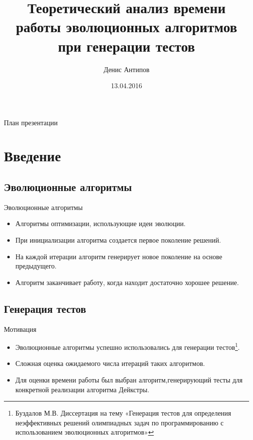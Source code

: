 \documentclass{beamer}
\begin{document}
\title[Автоматическая генерация тестов]{Теоретический анализ времени работы эволюционных алгоритмов при генерации тестов}
\author[Денис Антипов]{Денис Антипов}
\date{13.04.2016}

 
\begin{frame}
 \maketitle
\end{frame}
 
 \begin{frame}{План презентации}
  \tableofcontents
 \end{frame}

 \section{Введение}
 \subsection{Эволюционные алгоритмы}
 \begin{frame}{Эволюционные алгоритмы}
  \begin{itemize}
   \item Алгоритмы оптимизации, использующие идеи эволюции.
   \item При инициализации алгоритма создается первое поколение решений.
   \item На каждой итерации алгоритм генерирует новое поколение на основе предыдущего.
   \item Алгоритм заканчивает работу, когда находит достаточно хорошее решение.
  \end{itemize}
 \end{frame}
 
 \subsection{Генерация тестов}
 \begin{frame}{Мотивация}
  \begin{itemize}
   \item Эволюционные алгоритмы успешно использовались для генерации тестов\footnote{Буздалов М.В. Диссертация на тему «Генерация тестов для определения неэффективных решений олимпиадных задач по программированию с использованием эволюционных алгоритмов»}.
   \item Сложная оценка ожидаемого числа итераций таких алгоритмов.
   \item Для оценки времени работы был выбран алгоритм,генерирующий тесты для конкретной реализации алгоритма Дейкстры.
  \end{itemize}
 \end{frame}
 
\end{document}

